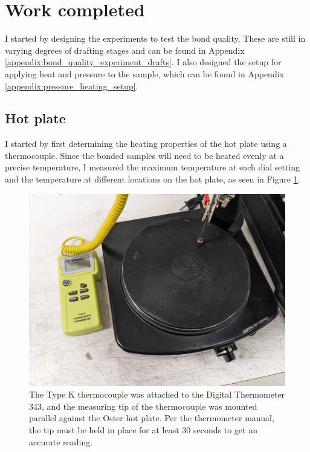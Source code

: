 \documentclass[colorlinks=true,pdfstartview=FitV,linkcolor=blue,
            citecolor=red,urlcolor=magenta]{ligodoc}
\begin{document}
\section{Work completed}

I started by designing the experiments to test the bond quality. These are still in varying degrees of drafting stages and can be found in Appendix \ref{appendix:bond_quality_experiment_drafts}. I also designed the setup for applying heat and pressure to the sample, which can be found in Appendix \ref{appendix:pressure_heating_setup}.

\subsection{Hot plate}

I started by first determining the heating properties of the hot plate using a thermocouple. Since the bonded samples will need to be heated evenly at a precise temperature, I measured the maximum temperature at each dial setting and the temperature at different locations on the hot plate, as seen in Figure \ref{fig:hotplate_heat_test_setup}.

\begin{figure}[htbp]
\begin{center}
\includegraphics[width=6in]{graphics/hotplate_heat_test_setup_PXL_20220708_230032062.jpg}
\caption{The Type K thermocouple was attached to the Digital Thermometer 343, and the measuring tip of the thermocouple was mounted parallel against the Oster hot plate. Per the thermometer manual, the tip must be held in place for at least 30 seconds to get an accurate reading.}
\label{fig:hotplate_heat_test_setup}
\end{center}
\end{figure}
\end{document}
